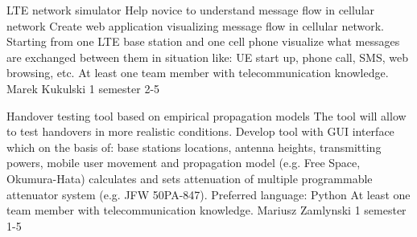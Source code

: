 \begin{project}
{LTE network simulator}
{Help novice to understand message flow in cellular network} 
{ 
Create web application visualizing message flow in cellular network. Starting
from one LTE base station and one cell phone visualize what messages are exchanged between them 
in situation like: UE start up, phone call, SMS, web browsing, etc.
}
{At least one team member with telecommunication knowledge.}
{Marek Kukulski}
{1 semester}
{2-5}
\end{project}
\begin{project}
{Handover testing tool based on empirical propagation models}
{The tool will allow to test handovers in more realistic conditions.} 
{ 
Develop tool with GUI interface which on the basis of: base stations locations, antenna heights, transmitting powers, mobile user movement and propagation model (e.g. Free Space, Okumura-Hata) calculates and sets attenuation of multiple programmable attenuator system (e.g. JFW 50PA-847).
}
{Preferred language: Python\newline
At least one team member with telecommunication knowledge.}
{Mariusz Zamlynski}
{1 semester}
{1-5}
\end{project}
